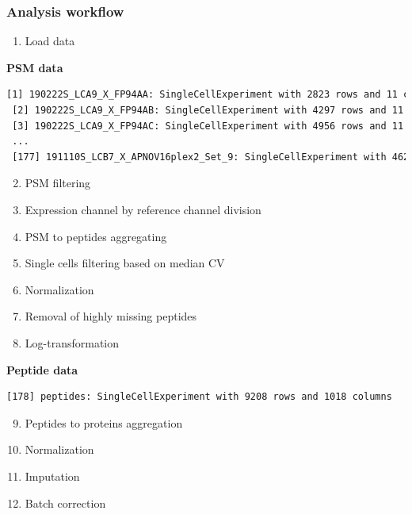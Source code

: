 \documentclass{beamer}
\newcommand{\frametitlesection}[1]{\frametitle{\centering #1 \footnotesize \hspace{0pt plus 1 filll} \insertsection}}
\begin{document}
\begin{frame}[fragile]
    \frametitlesection{Analysis workflow}
    
    \scriptsize
    
    \begin{enumerate}
        \item Load data
    \end{enumerate}
    
    \textbf{PSM data}
    
    \begin{lstlisting}[language = TeX, numbers = none, basicstyle = \ttfamily\@setfontsize{\srcsize}{5pt}{5pt}\color{vdgray}]
 [1] 190222S_LCA9_X_FP94AA: SingleCellExperiment with 2823 rows and 11 columns 
 [2] 190222S_LCA9_X_FP94AB: SingleCellExperiment with 4297 rows and 11 columns 
 [3] 190222S_LCA9_X_FP94AC: SingleCellExperiment with 4956 rows and 11 columns 
 ...
 [177] 191110S_LCB7_X_APNOV16plex2_Set_9: SingleCellExperiment with 4626 rows and 16 columns
    \end{lstlisting}
    
    \pause
    
    \begin{enumerate}
        \setcounter{enumi}{1}
        \item PSM filtering
        \item Expression channel by reference channel division
        \item PSM to peptides aggregating
        \item Single cells filtering based on median CV
        \item Normalization
        \item Removal of highly missing peptides
        \item Log-transformation 
    \end{enumerate}
    
    \textbf{Peptide data}
    
    \begin{lstlisting}[language = TeX, numbers = none, basicstyle = \ttfamily\@setfontsize{\srcsize}{5pt}{5pt}\color{vdgray}]
 [178] peptides: SingleCellExperiment with 9208 rows and 1018 columns
    \end{lstlisting}
    
    \pause
    
    \begin{enumerate}
        \setcounter{enumi}{8}
        \item Peptides to proteins aggregation
        \item Normalization
        \item Imputation
        \item Batch correction
    \end{enumerate}
    

\end{frame}
\end{document}

